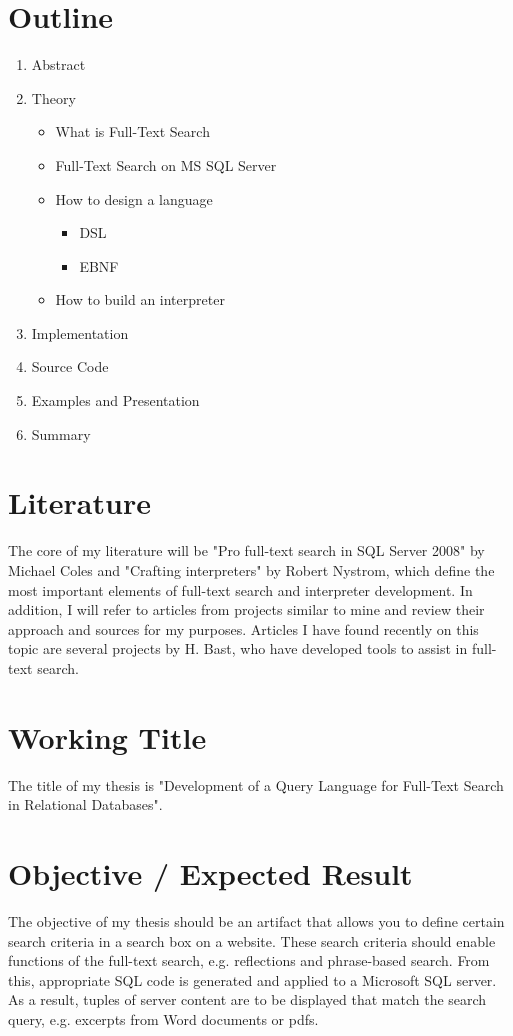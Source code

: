 \section{Outline}
\begin{enumerate}[noitemsep]
    \item Abstract
    \item Theory
    \begin{itemize}[noitemsep]
        \item What is Full-Text Search
        \item Full-Text Search on MS SQL Server
        \item How to design a language
        \begin{itemize}[noitemsep]
            \item DSL
            \item EBNF
        \end{itemize}
        \item How to build an interpreter
    \end{itemize}
    \item Implementation
    \item Source Code
    \item Examples and Presentation
    \item Summary
\end{enumerate}
\section{Literature}
The core of my literature will be "Pro full-text search in SQL Server 2008" by Michael Coles and "Crafting interpreters" by Robert Nystrom, which define the most important elements of full-text search and interpreter development. In addition, I will refer to articles from projects similar to mine and review their approach and sources for my purposes. Articles I have found recently on this topic are several projects by H. Bast, who have developed tools to assist in full-text search.
\section{Working Title}
The title of my thesis is "Development of a Query Language for Full-Text Search in Relational Databases".
\section{Objective / Expected Result }
The objective of my thesis should be an artifact that allows you to define certain search criteria in a search box on a website. These search criteria should enable functions of the full-text search, e.g. reflections and phrase-based search. From this, appropriate SQL code is generated and applied to a Microsoft SQL server. As a result, tuples of server content are to be displayed that match the search query, e.g. excerpts from Word documents or pdfs.

